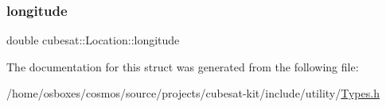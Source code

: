 \subsubsection{\texorpdfstring{longitude}{longitude}}
{\footnotesize\ttfamily double cubesat\+::\+Location\+::longitude}



The documentation for this struct was generated from the following file\+:\begin{DoxyCompactItemize}
\item 
/home/osboxes/cosmos/source/projects/cubesat-\/kit/include/utility/\hyperlink{Types_8h}{Types.\+h}\end{DoxyCompactItemize}
